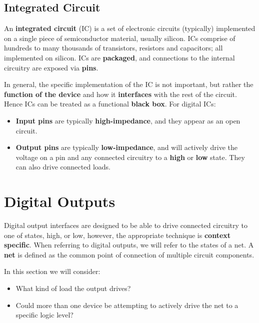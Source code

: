 \documentclass{report}
\begin{document}
\subsection{Integrated Circuit}
An \textbf{integrated circuit} (IC) is a set of electronic circuits (typically) implemented on a
single piece of semiconductor material, usually silicon. ICs comprise of hundreds to
many thousands of transistors, resistors and capacitors; all implemented on silicon.
ICs are \textbf{packaged}, and connections to the internal circuitry are exposed via \textbf{pins}.

In general, the specific implementation of the IC is not important, but
rather the \textbf{function of the device} and how it \textbf{interfaces} with the rest of the circuit.
Hence ICs can be treated as a functional \textbf{black box}.
For digital ICs:
\begin{itemize}
    \item \textbf{Input pins} are typically \textbf{high-impedance}, and they appear as an open circuit.
    \item \textbf{Output pins} are typically \textbf{low-impedance}, and will actively drive the voltage
          on a pin and any connected circuitry to a \textbf{high} or \textbf{low} state. They can also
          drive connected loads.
\end{itemize}
\section{Digital Outputs}
Digital output interfaces are designed to be able to drive connected circuitry to one of states,
high, or low, however, the appropriate technique is \textbf{context specific}.
When referring to digital outputs, we will refer to the states of a net. A \textbf{net}
is defined as the common point of connection of multiple circuit components.

In this section we will consider:
\begin{itemize}
    \item What kind of load the output drives?
    \item Could more than one device be attempting to actively drive the net
          to a specific logic level?
\end{itemize}
\end{document}
